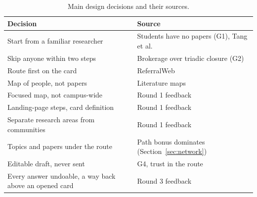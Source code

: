 \documentclass[sigconf,nonacm]{acmart}
\begin{document}
\begin{table}[t]
\caption{Main design decisions and their sources.}
\label{tab:decisions}
\small
\begin{tabularx}{\columnwidth}{@{}>{\raggedright\arraybackslash}X>{\raggedright\arraybackslash}p{}@{}}
\toprule
Decision & Source\\
\midrule
Start from a familiar researcher & Students have no papers (G1), Tang et al.~\cite{tang2012}\\
Skip anyone within two steps & Brokerage over triadic closure (G2)\\
Route first on the card & ReferralWeb~\cite{kautz1997}\\
Map of people, not papers & Literature maps~\cite{connectedpapers}\\
Focused map, not campus-wide & Round 1 feedback\\
Landing-page steps, card definition & Round 1 feedback\\
Separate research areas from communities & Round 1 feedback\\
Topics and papers under the route & Path bonus dominates (Section~\ref{sec:network})\\
Editable draft, never sent & G4, trust in the route\\
Every answer undoable, a way back above an opened card & Round 3 feedback\\
\bottomrule
\end{tabularx}
\end{table}
\end{document}

